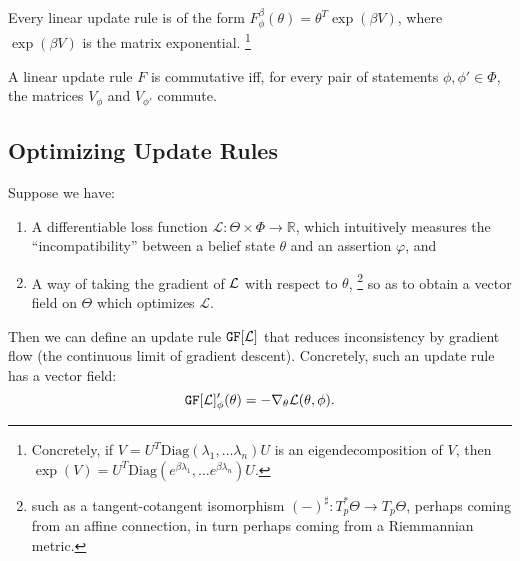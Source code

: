\documentclass{article}
\begin{document}

\begin{prop}
	Every linear update rule is of the form
	$
		F^{\beta}_\phi(\theta) =  \theta^{T} \exp(\beta V)
	$,
	where $\exp(\beta V)$ is the matrix exponential.%
		\footnote{Concretely, if $V = U^T \mathrm{Diag}(\lambda_1, \ldots \lambda_n) U$ is an eigendecomposition of $V$, then $\exp(V) = U^T \mathrm{Diag}(e^{\beta\lambda_1}, \ldots e^{\beta\lambda_n}) U$.}
\end{prop}

\begin{prop}
	A linear update rule $F$ is commutative iff, for every pair of statements  $\phi, \phi' \in \Phi$, the
	matrices $V_\phi$ and $V_{\phi'}$ commute.
\end{prop}




\subsection{Optimizing Update Rules}
Suppose we have:
\begin{enumerate}[nosep]
	\item A differentiable loss function $\mathcal L : \Theta \times \Phi  \to \mathbb R$, which intuitively measures the ``incompatibility'' between a belief state $\theta$ and an assertion $\varphi$, and
	\item
		A way of taking the gradient of ${\cal L}$ with respect to $\theta$,%
			\footnote{
			such as a tangent-cotangent isomorphism $(-)^\sharp : T^*_p\Theta \to T_p \Theta$, perhaps coming from an affine connection, in turn perhaps coming from a Riemmannian metric.}
        so as to obtain a vector field on $\Theta$ which optimizes $\mathcal L.$
\end{enumerate}
\def\GD#1{\mathtt{GF}[#1]}
\def\NGD#1{\mathtt{NGF}[#1]}

Then we can define an update rule $\GD {\cal L}$ that reduces inconsistency by gradient flow (the continuous limit of gradient descent). Concretely, such an update rule has a vector field:
\[
	\GD {\cal L}'_\phi(\theta) = - \nabla_\theta {\cal L}(\theta,\phi).
\]
\end{document}
